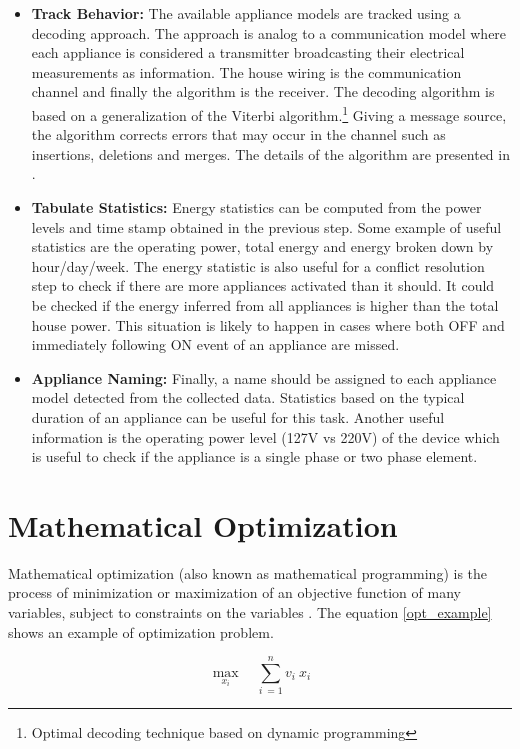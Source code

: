 \begin{itemize}
    \item \textbf{Track Behavior:} The available appliance models are tracked using a decoding approach. The approach is analog to a communication model where each appliance is considered a transmitter broadcasting their electrical measurements as information. The house wiring is the communication channel and finally the algorithm is the receiver. The decoding algorithm is based on a generalization of the Viterbi algorithm.\footnote{Optimal decoding technique based on dynamic programming} Giving a message source, the algorithm corrects errors that may occur in the channel such as insertions, deletions and merges. The details of the algorithm are presented in \cite{hart93}.  
    
    \item \textbf{Tabulate Statistics:} Energy statistics can be computed from the power levels and time stamp obtained in the previous step. Some example of useful statistics are the operating power, total energy and energy broken down by hour/day/week. The energy statistic is also useful for a conflict resolution step to check if there are more appliances activated than it should. It could be checked if the energy inferred from all appliances is higher than the total house power. This situation is likely to happen in cases where both OFF and immediately following ON event of an appliance are missed.   
    
    \item \textbf{Appliance Naming:} Finally, a name should be assigned to each appliance model detected from the collected data. Statistics based on the typical duration of an appliance can be useful for this task. Another useful information is the operating power level (127V vs 220V) of the device which is useful to check if the appliance is a single phase or two phase element. 

\end{itemize}



\section{Mathematical Optimization}
Mathematical optimization (also known as mathematical programming) is the process of minimization or maximization of an objective function of many variables, subject to constraints on the variables \cite{ampl}. The equation \eqref{opt_example} shows an example of optimization problem.

\begin{equation} \label{opt_example}
    \max_{x_i} \quad \sum_{i\ = 1}^{n} v_i\ x_i
\end{equation}

